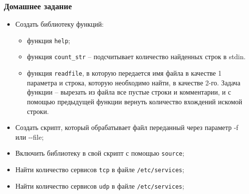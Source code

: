 \begin{frame}
	\frametitle{Домашнее задание}
	\begin{itemize}
		\item Создать библиотеку функций:
			\begin{itemize}
				\item функция {\tt help};
				\item функция {\tt count\_str} -- подсчитывает количество найденных строк в stdin.
				\item функция {\tt readfile}, в которую передается имя файла в качестве 1 параметра
					и строка, которую необходимо найти, в качестве 2-го.
					Задача функции -- вырезать из файла все пустые строки и комментарии, 
					и с помощью предыдущей функции вернуть количество вхождений искомой строки.
			\end{itemize}
		\item Создать скрипт, который обрабатывает файл переданный через параметр -f или -{}-file;
		\item Включить библиотеку в свой скрипт с помощью {\tt source};
		\item Найти количество сервисов {\tt tcp} в файле {\tt /etc/services};
		\item Найти количество сервисов {\tt udp} в файле {\tt /etc/services};
  \end{itemize}
\end{frame}
